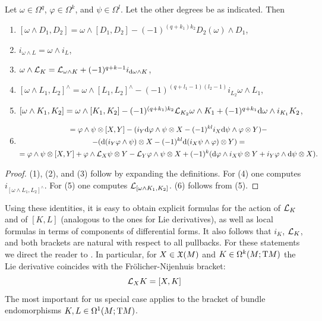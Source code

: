 \begin{thm}
    Let $\omega\in\Omega^q$, $\varphi\in\Omega^k$, and $\psi\in\Omega^l$. Let the other degrees be as indicated. Then 
    \begin{enumerate}[label=(\arabic*)]
        \item $[\omega\wedge D_1,D_2]=\omega\wedge [D_1,D_2]-(-1)^{(q+k_1)k_2}D_2(\omega)\wedge D_1$,
        \item $i_{\omega\wedge L}=\omega\wedge i_L$,
        \item $\omega\wedge\mathcal{L}_K=\mathcal{L}_{\omega\wedge K}+(-1)^{q+k-1}i_{{\mathrm{d}}\omega\wedge K}$,
        \item $[\omega\wedge L_1,L_2]^{\wedge}=\omega\wedge [L_1,L_2]^{\wedge}-(-1)^{(q+l_1-1)(l_2-1)}i_{L_2}\omega\wedge L_1$,
        \item $[\omega\wedge K_1,K_2]=\omega\wedge [K_1,K_2]-(-1)^{(q+k_1)k_2}\mathcal{L}_{K_2}\omega\wedge K_1+(-1)^{q+k_1}{\mathrm{d}}\omega\wedge i_{K_1}K_2$,
        \item \begin{multline}
            [\varphi\otimes X,\psi\otimes Y]=\varphi\wedge \psi\otimes[X,Y]
            -(i_Y\dd\varphi\wedge\psi\otimes X-(-1)^{kl}i_X\dd\psi\wedge\varphi\otimes Y)-\\
            -(\dd(i_Y\varphi\wedge\psi)\otimes X-(-1)^{kl}\dd(i_X\psi\wedge\varphi)\otimes Y)=\\
            =\varphi\wedge\psi\otimes [X,Y]+\varphi\wedge \Lie_X\psi\otimes Y-\Lie_Y\varphi\wedge\psi\otimes X+(-1)^{k}(\dd\varphi\wedge i_X\psi\otimes Y+i_Y\varphi\wedge\dd\psi\otimes X).
        \end{multline}
    \end{enumerate}
\end{thm}
\begin{proof}
    (1), (2), and (3) follow by expanding the definitions. For (4) one computes $i_{[\omega\wedge L_1,L_2]^{\wedge}}$. For (5) one computes $\mathcal{L}_{[\omega\wedge K_1,K_2]}$. (6) follows from (5).
\end{proof}

Using these identities, it is easy to obtain explicit formulas for the action of $\mathcal{L}_K$ and of $[K,L]$ (analogous to the ones for Lie derivatives), as well as local formulas in terms of components of differential forms. It also follows that $i_K$, $\mathcal{L}_K$, and both brackets are natural with respect to all pullbacks. For these statements we direct the reader to \cite[\S8]{Kolar}. In particular, for $X\in\mathfrak{X}(M)$ and $K\in\Omega^k(M;\mathrm{T} M)$ the Lie derivative coincides with the Fr\"olicher-Nijenhuis bracket:
\[\mathcal{L}_X K=[X,K]\]
The most important for us special case applies to the bracket of bundle endomorphisms $K,L\in\Omega^1(M;\mathrm{T} M)$.

